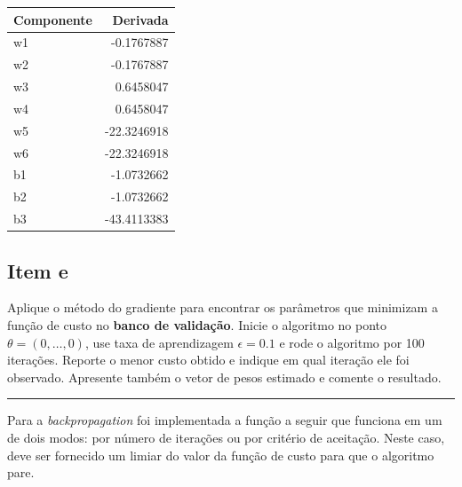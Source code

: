 \documentclass[
  a4paperpaper,
]{article}
\begin{document}
\begin{longtable}[]{@{}lr@{}}
\toprule\noalign{}
Componente & Derivada \\
\midrule\noalign{}
\endhead
\bottomrule\noalign{}
\endlastfoot
w1 & -0.1767887 \\
w2 & -0.1767887 \\
w3 & 0.6458047 \\
w4 & 0.6458047 \\
w5 & -22.3246918 \\
w6 & -22.3246918 \\
b1 & -1.0732662 \\
b2 & -1.0732662 \\
b3 & -43.4113383 \\
\end{longtable}

\subsection{Item e}\label{item-e}

Aplique o método do gradiente para encontrar os parâmetros que minimizam
a função de custo no \textbf{banco de validação}. Inicie o algoritmo no
ponto \(\theta = (0, \dots , 0)\), use taxa de aprendizagem
\(\epsilon = 0.1\) e rode o algoritmo por 100 iterações. Reporte o menor
custo obtido e indique em qual iteração ele foi observado. Apresente
também o vetor de pesos estimado e comente o resultado.

\begin{center}\rule{0.5\linewidth}{0.5pt}\end{center}

Para a \emph{backpropagation} foi implementada a função a seguir que
funciona em um de dois modos: por número de iterações ou por critério de
aceitação. Neste caso, deve ser fornecido um limiar do valor da função
de custo para que o algoritmo pare.
\end{document}
